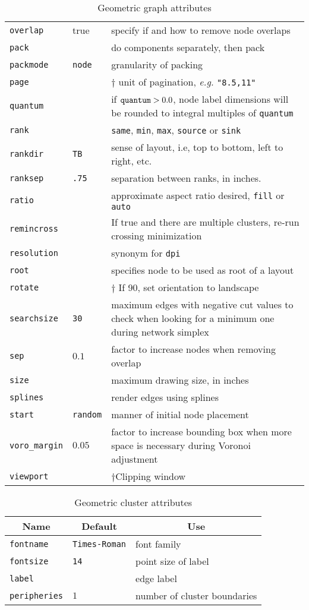 \begin{table}[htbp]
\begin{tabular}[t]{|l|l|p{2.5in}|}
{\tt overlap} & true & specify if and how to remove node overlaps \\
{\tt pack} &  & do components separately, then pack \\
{\tt packmode} & {\tt node} & granularity of packing \\
{\tt page} & & $\dagger$ unit of pagination, {\it e.g.} {\tt "8.5,11"} \\
{\tt quantum} &  & if ${\tt quantum} > 0.0$, node label dimensions will be rounded to integral multiples of {\tt quantum} \\
{\tt rank} & & {\tt same}, {\tt min}, {\tt max}, {\tt source} or {\tt sink} \\
{\tt rankdir} & {\tt TB} & sense of layout, i.e, top to bottom, left to right, etc. \\
{\tt ranksep} & {\tt .75} & separation between ranks, in inches. \\
{\tt ratio} & & approximate aspect ratio desired, {\tt fill} or {\tt auto} \\
{\tt remincross} & & If true and there are multiple clusters, re-run crossing minimization \\
{\tt resolution} & & synonym for {\tt dpi}  \\
{\tt root} & & specifies node to be used as root of a layout \\ 
{\tt rotate} & & $\dagger$ If 90, set orientation to landscape \\
{\tt searchsize} & {\tt 30} & maximum edges with negative cut values to
check when looking for a minimum one during network simplex \\
{\tt sep} & $0.1$ & factor to increase nodes when removing overlap \\
{\tt size} & & maximum drawing size, in inches \\
{\tt splines} &  & render edges using splines \\
{\tt start} & {\tt random} & manner of initial node placement \\
{\tt voro\_margin} & $0.05$ & factor to increase bounding box when more space is necessary during Voronoi adjustment \\
{\tt viewport} & & $\dagger$Clipping window \\
\hline
\end{tabular}
\caption{Geometric graph attributes}
\label{tab:gattr_geom}
\end{table}
\begin{table}[htbp]\footnotesize
\centering
\begin{tabular}[t]{|l|l|p{2.5in}|} \hline
\multicolumn{1}{|c|}{Name} & \multicolumn{1}{c|}{Default} & \multicolumn{1}{c|}{Use} \\ \hline
{\tt fontname} & {\tt Times-Roman} & font family \\
{\tt fontsize} & {\tt 14} & point size of label \\
{\tt label} & & edge label \\
{\tt peripheries} & $1$ & number of cluster boundaries \\
\hline
\end{tabular}
\caption{Geometric cluster attributes}
\label{tab:cattr_geom}
\end{table}
